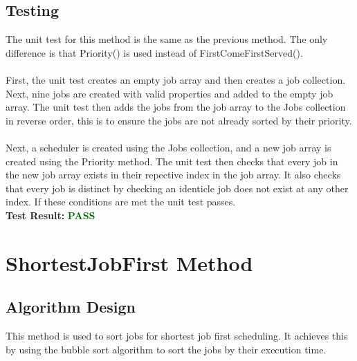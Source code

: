 \documentclass[12pt,a4paper]{article}
\begin{document}
		\newpage

		\subsection{Testing}
			The unit test for this method is the same as the previous method. The only difference is that 
			Priority() is used instead of FirstComeFirstServed().\\\\
			First, the unit test creates an empty job array and then creates a job collection. Next, nine 
			jobs are created with valid properties and added to the empty job array. The unit test then adds 
			the jobs from the job array to the Jobs collection in reverse order, this is to ensure the jobs 
			are not already sorted by their priority.\\\\
			Next, a scheduler is created using the Jobs collection, and a new job array is created 
			using the Priority method. The unit test then checks that every job in the 
			new job array exists in their repective index in the job array. It also checks that every job is
			distinct by checking an identicle job does not exist at any other index. If these conditions are 
			met the unit test passes.\\

			\textbf{Test Result:} \textbf{\textcolor{darkgreen}{PASS}}\\

	\newpage

	\section{ShortestJobFirst Method}
		\subsection{Algorithm Design}
			This method is used to sort jobs for shortest job first scheduling. It achieves this by 
			using the bubble sort algorithm to sort the jobs by their execution time.\\
			
\end{document}
